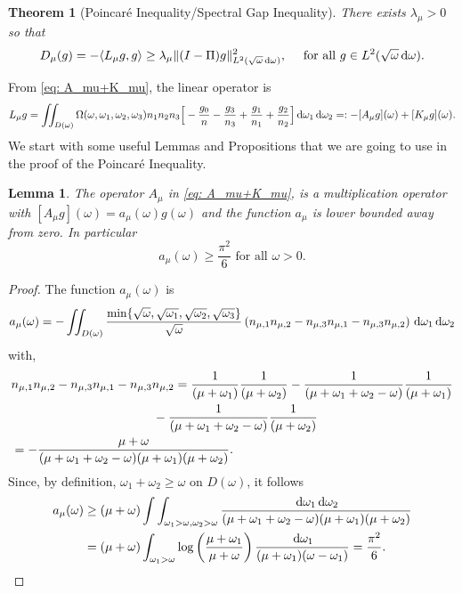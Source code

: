 \documentclass[reqno,11pt,letterpaper]{amsart}
\numberwithin{equation}{section}
\newcommand{\dd}{\, {\rm d}}
\newtheorem{theorem}{Theorem}
\newtheorem{lemma}[proposition]{Lemma}
\begin{document}
\begin{theorem}[Poincaré Inequality/Spectral Gap Inequality] \label{theo:SGI}
    There exists $\lambda_\mu >0$ so that 
    $$ D_{\mu}(g) = - \langle L_\mu g,g \rangle \geq \lambda_\mu \| (I - \Pi)g\|_{L^2(\sqrt{\omega}\dd \omega)}^2, \quad \text{ for all } g \in L^2(\sqrt{\omega}\dd\omega). $$
\end{theorem}
From \eqref{eq: A_mu+K_mu}, the linear operator is $$L_\mu g  = \iint_{D(\omega)} \Omega (\omega , \omega _1, \omega _2, \omega _3) n_1n_2n_3 \Big[-\frac{g_0}{n}  - \frac{g_3}{n_3} + \frac{g_1}{n_1} + \frac{g_2}{n_2}   
\Big] \dd \omega_1 \dd \omega_2 =: -[A_\mu g](\omega) + [K_\mu g](\omega).$$
We start with some useful Lemmas and Propositions that we are going to use in the proof of the Poincaré Inequality. 

\begin{lemma}\label{lemm:A_mu}
   The operator $A_\mu$ in \eqref{eq: A_mu+K_mu}, is a multiplication operator with $[A_\mu g](\omega) = a_\mu(\omega) g(\omega)$ and the function $a_\mu$ is lower bounded away from zero. In particular  
   $$ a_\mu(\omega) \geq \frac{\pi^2}{6} \text{ for all } \omega>0.$$
\end{lemma}

\begin{proof}
The function $a_\mu(\omega ) $ is
\begin{align*}
 a_\mu (\omega )= -\iint_{ D(\omega ) }\frac {\min\{\sqrt{\omega }, \sqrt{\omega _1}, \sqrt{\omega _2}, \sqrt{\omega _3}\}} {\sqrt{\omega }}\left(n_{\mu,1} n_{\mu,2} - n_{\mu,3}n_{\mu,1}-n_{\mu,3}n_{\mu,2} \right)\dd \omega _1 \dd \omega_2
   \end{align*}
   with,
   \begin{align*}
&n_{\mu,1}n_{\mu,2}-n_{\mu,3}n_{\mu,1}-n_{\mu,3}n_{\mu,2}=\frac{1}{(\mu +\omega _1)}\frac {1} {( \mu +\omega _2)}-\frac {1} {(\mu +\omega _1+\omega _2-\omega )}\frac {1} {(\mu +\omega _1)} \\
&\hskip 4cm -\frac {1} {(\mu +\omega _1+\omega _2-\omega )}\frac {1} {(\mu +\omega _2)}\\
&= -\frac {\mu +\omega } {(\mu +\omega _1+\omega _2-\omega )(\mu +\omega _1)(\mu +\omega _2)}.
\end{align*}
Since, by definition,  $\omega _1+\omega _2\ge \omega $ on $D(\omega )$, it follows
\begin{align*}
a_\mu (\omega )&\ge (\mu +\omega)
\int\int_{\omega _1>\omega , \omega _2>\omega }\frac {\dd \omega _1 \dd \omega _2 } {(\mu +\omega _1+\omega _2-\omega )(\mu +\omega _1)(\mu +\omega _2)}\\
&=(\mu +\omega )\int 
 _{ \omega _1>\omega  }    
 \log\left(\frac{\mu +\omega_1 }{\mu +\omega } \right)\frac{\dd \omega_1 }{(\mu +\omega _1)(\omega -\omega _1)}
 =\frac{\pi^2}{6}.
 \end{align*}


\end{proof}
\end{document}
